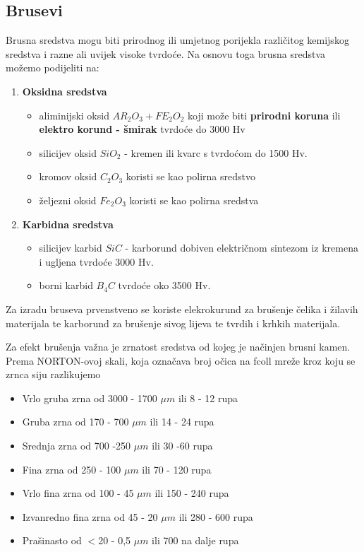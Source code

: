 \documentclass[a4paper,12pt]{article}
\numberwithin{figure}{section}
\begin{document}
\subsection{Brusevi}
Brusna sredstva mogu biti prirodnog ili umjetnog porijekla različitog kemijskog sredstva i razne ali uvijek visoke tvrdoće. Na osnovu toga brusna sredstva možemo podijeliti na:
\begin{enumerate}
\item \textbf{Oksidna sredstva}
\begin{itemize}
\item aliminijski oksid $AR_{2}O_{3} + FE_{2}O_{2}$ koji može biti \textbf{prirodni koruna} ili \textbf{elektro korund - šmirak} tvrdoće do 3000 Hv
\item silicijev oksid $SiO_{2}$ - kremen ili kvarc s tvrdoćom do 1500 Hv.
\item kromov oksid $C_{2}O_{3}$ koristi se kao polirna sredstvo
\item željezni oksid $Fe_{2}O_{3}$ koristi se kao polirna sredstva
\end{itemize}
\item \textbf{Karbidna sredstva}
\begin{itemize}
\item silicijev karbid $SiC$ - karborund dobiven električnom sintezom iz kremena i ugljena tvrdoće 3000 Hv.
\item borni karbid $B_{4}C$ tvrdoće oko 3500 Hv.
\end{itemize}
\end{enumerate}
Za izradu bruseva prvenstveno se koriste elekrokurund za brušenje čelika i žilavih materijala te karborund za brušenje sivog lijeva te tvrdih i krhkih materijala. \par
Za efekt brušenja važna je zrnatost sredstva od kojeg je načinjen brusni kamen. Prema NORTON-ovoj skali, koja označava broj očica na fcoll mreže kroz koju se zrnca siju razlikujemo
\begin{itemize}
\item Vrlo gruba zrna od 3000 - 1700 $\mu m$ ili 8 - 12 rupa
\item Gruba zrna od 170 - 700 $\mu m$ ili 14 - 24 rupa
\item Srednja zrna od 700 -250 $\mu m$ ili 30 -60 rupa
\item Fina zrna od 250 - 100 $\mu m$ ili 70 - 120 rupa
\item Vrlo fina zrna od 100 - 45 $\mu m$ ili 150 - 240 rupa
\item Izvanredno fina zrna od 45 - 20 $\mu m$ ili 280 - 600 rupa
\item Prašinasto od $<$20 - 0,5 $\mu m$ ili 700 na dalje rupa
\end{itemize}
\end{document}
